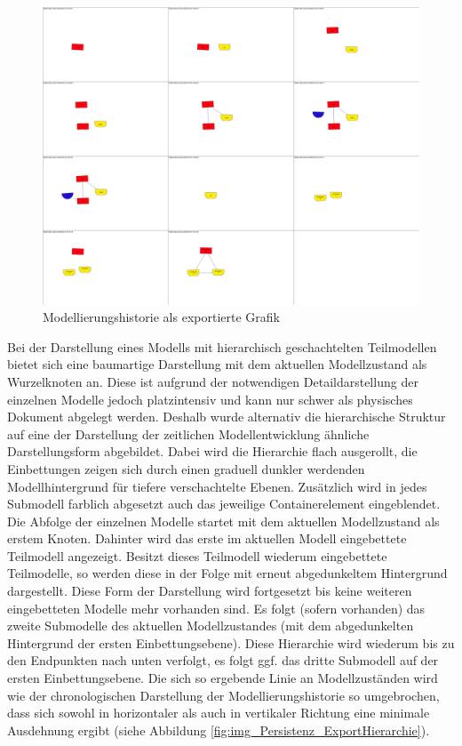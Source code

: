 \begin{figure}[htbp]
	\centering
		\includegraphics[width=15cm]{img/Persistenz/ExportHistorie.png}
	\caption{Modellierungshistorie als exportierte Grafik}
	\label{fig:img_Persistenz_ExportHistorie}
\end{figure}

Bei der Darstellung eines Modells mit hierarchisch geschachtelten Teilmodellen bietet sich eine baumartige Darstellung mit dem aktuellen Modellzustand als Wurzelknoten an. Diese ist aufgrund der notwendigen Detaildarstellung der einzelnen Modelle jedoch platzintensiv und kann nur schwer als physisches Dokument abgelegt werden. Deshalb wurde alternativ die hierarchische Struktur auf eine der Darstellung der zeitlichen Modellentwicklung ähnliche Darstellungsform abgebildet. Dabei wird die Hierarchie flach ausgerollt, die Einbettungen zeigen sich durch einen graduell dunkler werdenden Modellhintergrund für tiefere verschachtelte Ebenen. Zusätzlich wird in jedes Submodell farblich abgesetzt auch das jeweilige Containerelement eingeblendet. Die Abfolge der einzelnen Modelle startet mit dem aktuellen Modellzustand als erstem Knoten. Dahinter wird das erste im aktuellen Modell eingebettete Teilmodell angezeigt. Besitzt dieses Teilmodell wiederum eingebettete Teilmodelle, so werden diese in der Folge mit erneut abgedunkeltem Hintergrund dargestellt. Diese Form der Darstellung wird fortgesetzt bis keine weiteren eingebetteten Modelle mehr vorhanden sind. Es folgt (sofern vorhanden) das zweite Submodelle des aktuellen Modellzustandes (mit dem abgedunkelten Hintergrund der ersten Einbettungsebene). Diese Hierarchie wird wiederum bis zu den Endpunkten nach unten verfolgt, es folgt ggf. das dritte Submodell auf der ersten Einbettungsebene. Die sich so ergebende Linie an Modellzuständen wird wie der chronologischen Darstellung der Modellierungshistorie so umgebrochen, dass sich sowohl in horizontaler als auch in vertikaler Richtung eine minimale Ausdehnung ergibt (siehe Abbildung \ref{fig:img_Persistenz_ExportHierarchie}).

